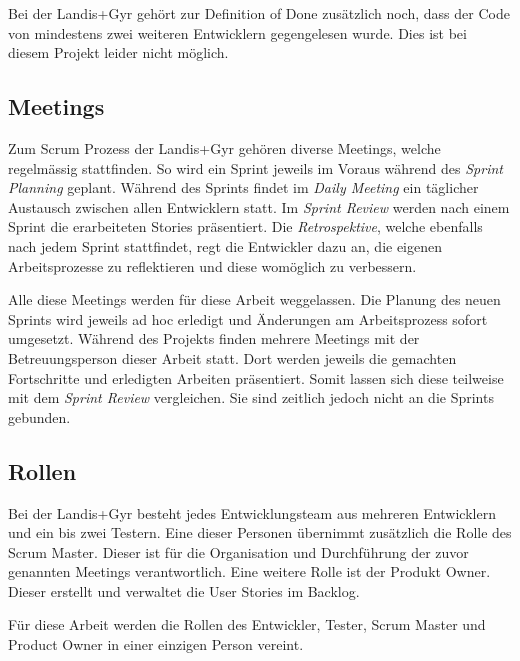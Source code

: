 Bei der Landis+Gyr gehört zur Definition of Done zusätzlich noch, dass der Code von mindestens zwei weiteren Entwicklern gegengelesen wurde.
Dies ist bei diesem Projekt leider nicht möglich.


\subsection{Meetings}
Zum Scrum Prozess der Landis+Gyr gehören diverse Meetings, welche regelmässig stattfinden.
So wird ein Sprint jeweils im Voraus während des \textit{Sprint Planning} geplant.
Während des Sprints findet im \textit{Daily Meeting} ein täglicher Austausch zwischen allen Entwicklern statt.
Im \textit{Sprint Review} werden nach einem Sprint die erarbeiteten Stories präsentiert.
Die \textit{Retrospektive}, welche ebenfalls nach jedem Sprint stattfindet, regt die Entwickler dazu an, die eigenen Arbeitsprozesse zu reflektieren und diese womöglich zu verbessern.

Alle diese Meetings werden für diese Arbeit weggelassen.
Die Planung des neuen Sprints wird jeweils ad hoc erledigt und Änderungen am Arbeitsprozess sofort umgesetzt.
Während des Projekts finden mehrere Meetings mit der Betreuungsperson dieser Arbeit statt.
Dort werden jeweils die gemachten Fortschritte und erledigten Arbeiten präsentiert.
Somit lassen sich diese teilweise mit dem \textit{Sprint Review} vergleichen.
Sie sind zeitlich jedoch nicht an die Sprints gebunden.

\subsection{Rollen}
Bei der Landis+Gyr besteht jedes Entwicklungsteam aus mehreren Entwicklern und ein bis zwei Testern.
Eine dieser Personen übernimmt zusätzlich die Rolle des Scrum Master.
Dieser ist für die Organisation und Durchführung der zuvor genannten Meetings verantwortlich.
Eine weitere Rolle ist der Produkt Owner.
Dieser erstellt und verwaltet die User Stories im Backlog.

Für diese Arbeit werden die Rollen des Entwickler, Tester, Scrum Master und Product Owner in einer einzigen Person vereint.


